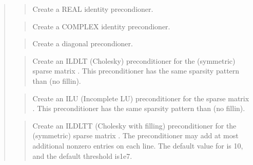 \documentclass[a4paper,11pt,english]{sphinxmanual}
\begin{document}
\sphinxAtStartPar
{}
\begin{quote}

\sphinxAtStartPar
{}
\begin{quote}

\sphinxAtStartPar
Create a REAL identity precondioner.
\end{quote}

\sphinxAtStartPar
{}
\begin{quote}

\sphinxAtStartPar
Create a COMPLEX identity precondioner.
\end{quote}

\sphinxAtStartPar
{}
\begin{quote}

\sphinxAtStartPar
Create a diagonal precondioner.
\end{quote}

\sphinxAtStartPar
{}
\begin{quote}

\sphinxAtStartPar
Create an ILDLT (Cholesky) preconditioner for the (symmetric) sparse
matrix . This preconditioner has the same sparsity pattern than 
(no fill\sphinxhyphen{}in).
\end{quote}

\sphinxAtStartPar
{}
\begin{quote}

\sphinxAtStartPar
Create an ILU (Incomplete LU) preconditioner for the sparse
matrix . This preconditioner has the same sparsity pattern
than  (no fill\sphinxhyphen{}in).
\end{quote}

\sphinxAtStartPar
{}
\begin{quote}

\sphinxAtStartPar
Create an ILDLTT (Cholesky with filling) preconditioner for the
(symmetric) sparse matrix . The preconditioner may add at most
 additional non\sphinxhyphen{}zero entries on each line. The default value
for  is 10, and the default threshold is1e\sphinxhyphen{}7.
\end{quote}


\end{quote}
\end{document}
